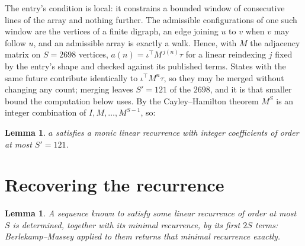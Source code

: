 \documentclass[11pt,a4paper]{article}
\theoremstyle{plain}
\newtheorem{lemma}[theorem]{Lemma}
\theoremstyle{definition}
\begin{document}
The entry's condition is local: it constrains a bounded window of consecutive lines of the
array and nothing further. The admissible configurations of one such window are the vertices
of a finite digraph, an edge joining $u$ to $v$ when $v$ may follow $u$, and an admissible
array is exactly a walk. Hence, with $M$ the adjacency matrix on $S=2698$ vertices,
$a(n)=\iota^{\!\top}M^{\,j(n)}\tau$ for a linear reindexing $j$ fixed by the entry's shape
and checked against its published terms. States with the same future contribute identically to $\iota^{\!\top}M^n\tau$, so they may be merged without changing any count; merging leaves $S'=121$ of the $2698$, and it is that smaller bound the computation below uses. By the Cayley--Hamilton theorem $M^{S}$ is an
integer combination of $I,M,\dots,M^{S-1}$, so:

\begin{lemma}\label{lem:cf}
$a$ satisfies a monic linear recurrence with integer coefficients of order at most
$S'=121$.
\end{lemma}

\section{Recovering the recurrence}

\begin{lemma}\label{lem:bm}
A sequence known to satisfy some linear recurrence of order at most $S$ is determined, together
with its minimal recurrence, by its first $2S$ terms: Berlekamp--Massey applied to them returns
that minimal recurrence exactly.
\end{lemma}
\end{document}
